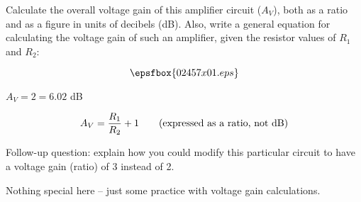 

Calculate the overall voltage gain of this amplifier circuit ($A_V$), both as a ratio and as a figure in units of decibels (dB).  Also, write a general equation for calculating the voltage gain of such an amplifier, given the resistor values of $R_1$ and $R_2$:

$$\epsfbox{02457x01.eps}$$







$A_V = 2 = 6.02$ dB 

$$A_V = {R_1 \over R_2} + 1 \hbox{\hskip 20pt (expressed as a ratio, not dB)}$$

\vskip 10pt

Follow-up question: explain how you could modify this particular circuit to have a voltage gain (ratio) of 3 instead of 2.







Nothing special here -- just some practice with voltage gain calculations.




